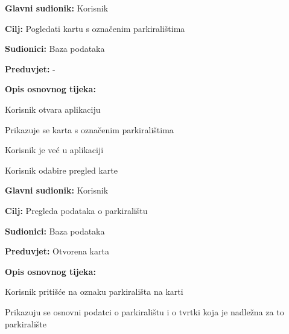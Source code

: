 \noindent {}
\begin{packed_item}
	
	\item \textbf{Glavni sudionik: } Korisnik
	\item \textbf{Cilj:} Pogledati kartu s označenim parkiralištima
	\item \textbf{Sudionici:} Baza podataka
	\item \textbf{Preduvjet:} -
	\item \textbf{Opis osnovnog tijeka:}
	
	\item[] \begin{packed_enum}
		
		\item Korisnik otvara aplikaciju
		\item Prikazuje se karta s označenim parkiralištima

	\end{packed_enum}
	
	\item[] \begin{packed_item}
	
		\item[1.a] Korisnik je već u aplikaciji
		\item[] \begin{packed_enum}
			
			\item Korisnik odabire pregled karte
			
	    \end{packed_enum}
    \end{packed_item}
\end{packed_item}

\noindent {}
\begin{packed_item}
	
	\item \textbf{Glavni sudionik:} Korisnik
	\item \textbf{Cilj:} Pregleda podataka o parkiralištu
	\item \textbf{Sudionici:} Baza podataka
	\item \textbf{Preduvjet:} Otvorena karta
	\item \textbf{Opis osnovnog tijeka:}
	
	\item[] \begin{packed_enum}
		
		\item Korisnik pritišće na oznaku parkirališta na karti
		\item Prikazuju se osnovni podatci o parkiralištu i o tvrtki koja je nadležna za to parkiralište

	\end{packed_enum}
\end{packed_item}

